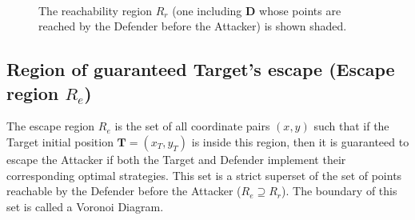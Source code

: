 \begin{figure}
\centering
{}\label{2_g<1}
\quad
{}\label{2_g=1}
\\
\label{2_g>1}
\caption{The reachability region $R_r$ (one including $\boldsymbol{D}$ whose points are reached by the Defender before the Attacker) is shown shaded.}
\label{Rr2}
\end{figure}

\subsection{Region of guaranteed Target's escape (Escape region $R_e$)}
The escape region $R_e$ is the set of all coordinate pairs $(x,y)$ such that if the Target initial position $\boldsymbol{T}=(x_{T},y_{T})$ is inside this region, then it is guaranteed to escape the Attacker if both the Target and Defender implement their corresponding optimal strategies. This set is a strict superset of the set of points reachable by the Defender before the Attacker ($R_e\supseteq R_r$). The boundary of this set is called a Voronoi Diagram.

